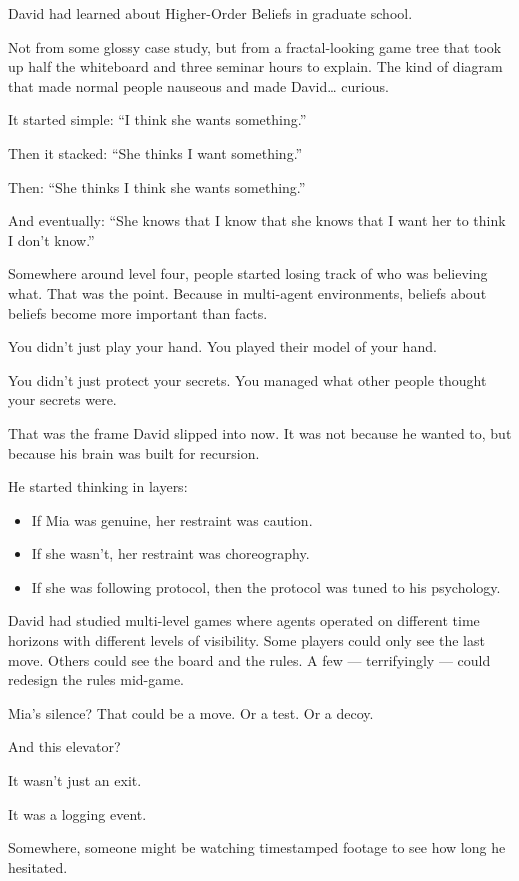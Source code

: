 David had learned about Higher-Order Beliefs in graduate school.

Not from some glossy case study, but from a fractal-looking game tree that took up half the whiteboard and three seminar hours to explain.
The kind of diagram that made normal people nauseous and made David… curious.

It started simple:
``I think she wants something.''

Then it stacked:
``She thinks I want something.''

Then:
``She thinks I think she wants something.''

And eventually:
``She knows that I know that she knows that I want her to think I don’t know.''

Somewhere around level four, people started losing track of who was believing what.
That was the point.
Because in multi-agent environments, beliefs about beliefs become more important than facts.

You didn’t just play your hand.
You played their model of your hand.

You didn’t just protect your secrets.
You managed what other people thought your secrets were.

That was the frame David slipped into now. It was not because he wanted to, but because his 
brain was built for recursion.

He started thinking in layers:

\begin{itemize}
    \item If Mia was genuine, her restraint was caution.
    \item If she wasn’t, her restraint was choreography.
    \item If she was following protocol, then the protocol was tuned to his psychology.
\end{itemize}

David had studied multi-level games where agents operated on different time horizons with 
different levels of visibility.
Some players could only see the last move.
Others could see the board and the rules.
A few --- terrifyingly --- could redesign the rules mid-game.

Mia’s silence?
That could be a move.
Or a test.
Or a decoy.

And this elevator?

It wasn’t just an exit.

It was a logging event.

Somewhere, someone might be watching timestamped footage to see how long he hesitated.

